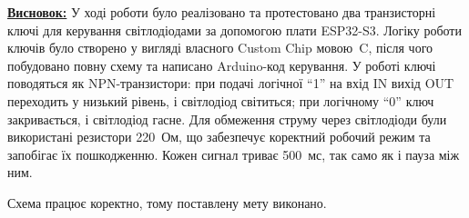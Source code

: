 \documentclass[12pt,a4paper]{article}
\begin{document}
    \newpage

    \noindent
\textbf{\underline{Висновок:}} У ході роботи було реалізовано та протестовано два транзисторні ключі для керування світлодіодами за допомогою плати ESP32-S3. Логіку роботи ключів було створено у вигляді власного Custom Chip мовою~C, після чого побудовано повну схему та написано Arduino-код керування. У роботі ключі поводяться як NPN-транзистори: при подачі логічної ``1'' на вхід IN вихід OUT переходить у низький рівень, і світлодіод світиться; при логічному ``0'' ключ закривається, і світлодіод гасне. Для обмеження струму через світлодіоди були використані резистори 220~Ом, що забезпечує коректний робочий режим та запобігає їх пошкодженню. Кожен сигнал триває 500~мс, так само як і пауза між ним.

Схема працює коректно, тому поставлену мету виконано.
\end{document}

